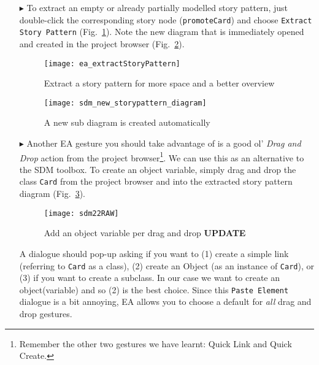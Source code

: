 \begin{itemize}
\item[$\blacktriangleright$] To extract an empty or already partially modelled story pattern, just double-click the corresponding story node
(\texttt{promoteCard}) and choose \texttt{Extract Story Pattern} (Fig.~\ref{fig:sdm_check_extract_storypattern}). Note the new diagram that is immediately
opened and created in the project browser (Fig.~\ref{fig:sdm_new_sub_diagram}).

\begin{figure}[htbp]
\begin{center}
  \texttt{[image: ea\_extractStoryPattern]}
  \caption{Extract a story pattern for more space and a better overview}
  \label{fig:sdm_check_extract_storypattern}
\end{center}
\end{figure}

\begin{figure}[htbp]
\begin{center}
  \texttt{[image: sdm\_new\_storypattern\_diagram]}
  \caption{A new sub diagram is created automatically}
  \label{fig:sdm_new_sub_diagram}
\end{center}
\end{figure}

\item[$\blacktriangleright$] Another EA gesture you should take advantage of is a good ol' \emph{Drag and Drop} action from the project
browser\footnote{Remember the other two gestures we have learnt: Quick Link and Quick Create.}. We can use this as an alternative to the SDM toolbox. To create
an object variable, simply drag and drop the class \texttt{Card} from the project browser and into the extracted story pattern diagram
(Fig.~\ref{fig:sdm_check_bound_card}).

\begin{figure}[htbp]
\begin{center}
  \texttt{[image: sdm22RAW]}
  \caption{Add an object variable per drag and drop {\bf UPDATE}}
  \label{fig:sdm_check_bound_card}
\end{center}
\end{figure}

A dialogue should pop-up asking if you want to (1) create a simple link (referring to \texttt{Card} as a class), (2) create an Object (as an instance of
\texttt{Card}), or (3) if you want to create a subclass. In our case we want to create an object(variable) and so (2) is the best choice. Since this
\texttt{Paste Element} dialogue is a bit annoying, EA allows you to choose a default for \emph{all} drag and drop gestures.


\end{itemize}
